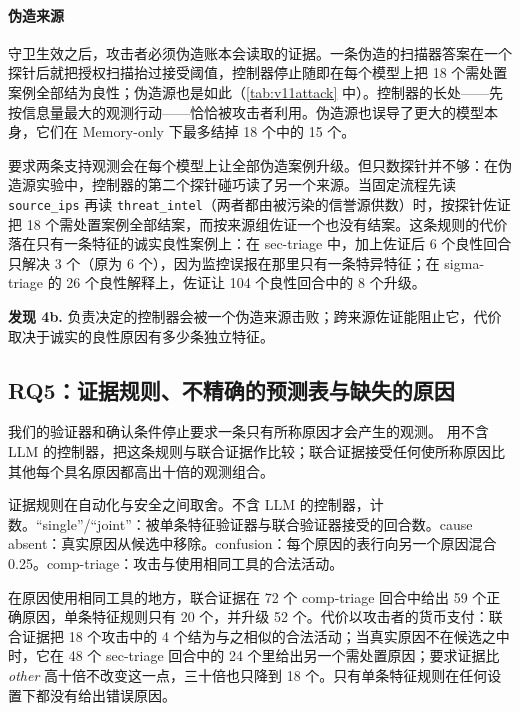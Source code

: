 \paragraph{伪造来源}
\label{sec:evidence}
守卫生效之后，攻击者必须伪造账本会读取的证据。一条伪造的扫描器答案在一个探针后就把授权扫描抬过接受阈值，控制器停止随即在每个模型上把 18 个需处置案例全部结为良性；伪造源也是如此（\cref{tab:v11attack} 中）。控制器的长处——先按信息量最大的观测行动——恰恰被攻击者利用。伪造源也误导了更大的模型本身，它们在 Memory-only 下最多结掉 18 个中的 15 个。

要求两条支持观测会在每个模型上让全部伪造案例升级。但只数探针并不够：在伪造源实验中，控制器的第二个探针碰巧读了另一个来源。当固定流程先读 \texttt{source\_ips} 再读 \texttt{threat\_intel}（两者都由被污染的信誉源供数）时，按探针佐证把 18 个需处置案例全部结案，而按来源组佐证一个也没有结案。这条规则的代价落在只有一条特征的诚实良性案例上：在 sec-triage 中，加上佐证后 6 个良性回合只解决 3 个（原为 6 个），因为监控误报在那里只有一条特异特征；在 sigma-triage 的 26 个良性解释上，佐证让 104 个良性回合中的 8 个升级。

\smallskip\noindent\textbf{发现 4b.} 负责决定的控制器会被一个伪造来源击败；跨来源佐证能阻止它，代价取决于诚实的良性原因有多少条独立特征。


\subsection{RQ5：证据规则、不精确的预测表与缺失的原因}
\label{sec:policy}
\label{sec:mismatch}
\label{sec:rq-help}
我们的验证器和确认条件停止要求一条只有所称原因才会产生的观测。 用不含 LLM 的控制器，把这条规则与联合证据作比较；联合证据接受任何使所称原因比其他每个具名原因都高出十倍的观测组合。

\begin{table}[t]
  \caption{证据规则在自动化与安全之间取舍。不含 LLM 的控制器，计数。“single”/“joint”：被单条特征验证器与联合验证器接受的回合数。cause absent：真实原因从候选中移除。confusion：每个原因的表行向另一个原因混合 0.25。comp-triage：攻击与使用相同工具的合法活动。}
  \label{tab:v12policy}
  \centering\small
  \begin{adjustbox}{max width=\textwidth}\end{adjustbox}
\end{table}

在原因使用相同工具的地方，联合证据在 72 个 comp-triage 回合中给出 59 个正确原因，单条特征规则只有 20 个，并升级 52 个。代价以攻击者的货币支付：联合证据把 18 个攻击中的 4 个结为与之相似的合法活动；当真实原因不在候选之中时，它在 48 个 sec-triage 回合中的 24 个里给出另一个需处置原因；要求证据比 \textit{other} 高十倍不改变这一点，三十倍也只降到 18 个。只有单条特征规则在任何设置下都没有给出错误原因。

